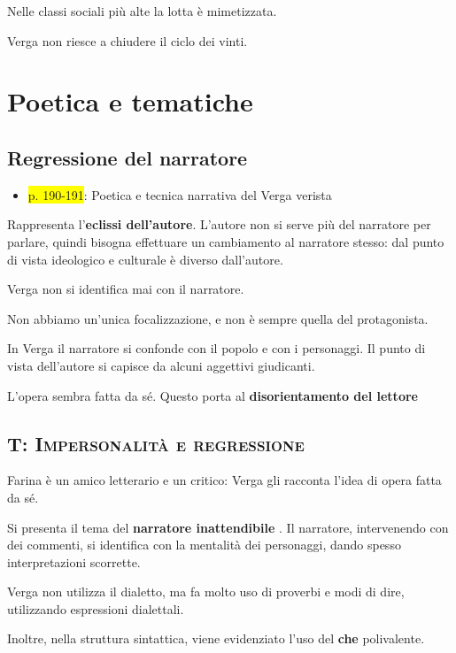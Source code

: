 \documentclass{book}
\newcommand{\pagine}[1]{\colorbox{yellow}{#1}}
\newcommand{\evidenziatore}[1]{\textbf{#1}}
\begin{document}
Nelle classi sociali più alte la lotta è mimetizzata.

Verga non riesce a chiudere il ciclo dei vinti.

\section{Poetica e tematiche}

\subsection{Regressione del narratore}

\begin{itemize}

\item
  \pagine{p. 190-191}: Poetica e tecnica narrativa del Verga verista
\end{itemize}

Rappresenta l'\textbf{eclissi dell'autore}. L'autore non si serve più
del narratore per parlare, quindi bisogna effettuare un cambiamento al
narratore stesso: dal punto di vista ideologico e culturale è diverso
dall'autore.

Verga non si identifica mai con il narratore.

Non abbiamo un'unica focalizzazione, e non è sempre quella del
protagonista.

In Verga il narratore si confonde con il popolo e con i personaggi. Il
punto di vista dell'autore si capisce da alcuni aggettivi giudicanti.

L'opera sembra fatta da sé. Questo porta al \textbf{disorientamento del
lettore}

\subsection{T: \textsc{Impersonalità e regressione}}

Farina è un amico letterario e un critico: Verga gli racconta l'idea di
opera fatta da sé.

Si presenta il tema del \evidenziatore{\textbf{narratore inattendibile}} . Il
narratore, intervenendo con dei commenti, si identifica con la mentalità
dei personaggi, dando spesso interpretazioni scorrette.

Verga non utilizza il dialetto, ma fa molto uso di proverbi e modi di
dire, utilizzando espressioni dialettali.

Inoltre, nella struttura sintattica, viene evidenziato l'uso del
\textbf{che} polivalente.
\end{document}
